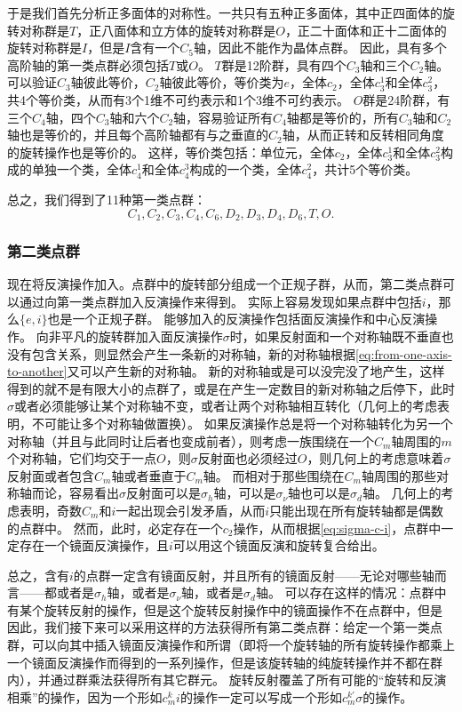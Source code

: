 于是我们首先分析正多面体的对称性。一共只有五种正多面体，其中正四面体的旋转对称群是$T$，正八面体和立方体的旋转对称群是$O$，正二十面体和正十二面体的旋转对称群是$I$，但是$I$含有一个$C_5$轴，因此不能作为晶体点群。
因此，具有多个高阶轴的第一类点群必须包括$T$或$O$。
$T$群是12阶群，具有四个$C_3$轴和三个$C_2$轴。可以验证$C_3$轴彼此等价，$C_2$轴彼此等价，等价类为$e$，全体$c_2$，全体$c_3^1$和全体$c_3^2$，共4个等价类，从而有3个1维不可约表示和1个3维不可约表示。
$O$群是24阶群，有三个$C_4$轴，四个$C_3$轴和六个$C_2$轴，容易验证所有$C_4$轴都是等价的，所有$C_3$轴和$C_2$轴也是等价的，并且每个高阶轴都有与之垂直的$C_2$轴，从而正转和反转相同角度的旋转操作也是等价的。
这样，等价类包括：单位元，全体$c_2$，全体$c_3^1$和全体$c_3^2$构成的单独一个类，全体$c_4^1$和全体$c_4^3$构成的一个类，全体$c_4^2$，共计5个等价类。

总之，我们得到了11种第一类点群：
\[
    C_1, C_2, C_3, C_4, C_6, D_2, D_3, D_4, D_6, T, O.
\]

\subsubsection{第二类点群} 

现在将反演操作加入。点群中的旋转部分组成一个正规子群，从而，第二类点群可以通过向第一类点群加入反演操作来得到。
实际上容易发现如果点群中包括$i$，那么$\{e, i\}$也是一个正规子群。
能够加入的反演操作包括面反演操作和中心反演操作。
向非平凡的旋转群加入面反演操作$\sigma$时，如果反射面和一个对称轴既不垂直也没有包含关系，则显然会产生一条新的对称轴，新的对称轴根据\eqref{eq:from-one-axis-to-another}又可以产生新的对称轴。
新的对称轴或是可以没完没了地产生，这样得到的就不是有限大小的点群了，或是在产生一定数目的新对称轴之后停下，此时$\sigma$或者必须能够让某个对称轴不变，或者让两个对称轴相互转化（几何上的考虑表明，不可能让多个对称轴做置换）。
如果反演操作总是将一个对称轴转化为另一个对称轴（并且与此同时让后者也变成前者），则考虑一族围绕在一个$C_m$轴周围的$m$个对称轴，它们均交于一点$O$，则$\sigma$反射面也必须经过$O$，则几何上的考虑意味着$\sigma$反射面或者包含$C_m$轴或者垂直于$C_m$轴。
而相对于那些围绕在$C_m$轴周围的那些对称轴而论，容易看出$\sigma$反射面可以是$\sigma_h$轴，可以是$\sigma_\nu$轴也可以是$\sigma_d$轴。
几何上的考虑表明，奇数$C_m$和$i$一起出现会引发矛盾，从而$i$只能出现在所有旋转轴都是偶数的点群中。
然而，此时，必定存在一个$c_2$操作，从而根据\eqref{eq:sigma-c-i}，点群中一定存在一个镜面反演操作，且$i$可以用这个镜面反演和旋转复合给出。

总之，含有$i$的点群一定含有镜面反射，并且所有的镜面反射——无论对哪些轴而言——都或者是$\sigma_h$轴，或者是$\sigma_\nu$轴，或者是$\sigma_d$轴。
可以存在这样的情况：点群中有某个旋转反射的操作，但是这个旋转反射操作中的镜面操作不在点群中，但是
因此，我们接下来可以采用这样的方法获得所有第二类点群：给定一个第一类点群，可以向其中插入镜面反演操作和所谓（即将一个旋转轴的所有旋转操作都乘上一个镜面反演操作而得到的一系列操作，但是该旋转轴的纯旋转操作并不都在群内），并通过群乘法获得所有其它群元。
旋转反射覆盖了所有可能的“旋转和反演相乘”的操作，因为一个形如$c_m^k i$的操作一定可以写成一个形如$c_m^{k'} \sigma$的操作。

